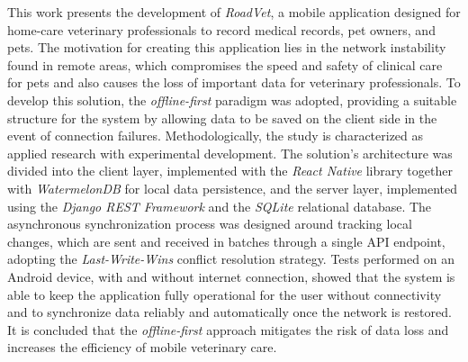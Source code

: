 This work presents the development of \textit{RoadVet}, a mobile application designed for home-care veterinary professionals to record medical records, pet owners, and pets. The motivation for creating this application lies in the network instability found in remote areas, which compromises the speed and safety of clinical care for pets and also causes the loss of important data for veterinary professionals. To develop this solution, the \textit{offline-first} paradigm was adopted, providing a suitable structure for the system by allowing data to be saved on the client side in the event of connection failures. Methodologically, the study is characterized as applied research with experimental development. The solution's architecture was divided into the client layer, implemented with the \textit{React Native} library together with \textit{WatermelonDB} for local data persistence, and the server layer, implemented using the \textit{Django REST Framework} and the \textit{SQLite} relational database. The asynchronous synchronization process was designed around tracking local changes, which are sent and received in batches through a single API endpoint, adopting the \textit{Last-Write-Wins} conflict resolution strategy. Tests performed on an Android device, with and without internet connection, showed that the system is able to keep the application fully operational for the user without connectivity and to synchronize data reliably and automatically once the network is restored. It is concluded that the \textit{offline-first} approach mitigates the risk of data loss and increases the efficiency of mobile veterinary care.

